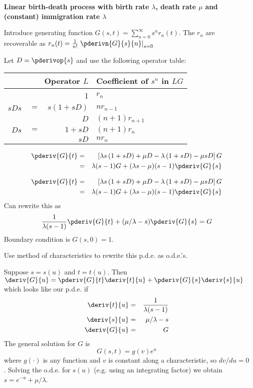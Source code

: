 \documentclass{beamer}
\begin{document}
\begin{frame}{}
{\bf Linear birth-death process with birth rate $\lambda$, death rate $\mu$ and (constant) immigration rate $\lambda$}

 Introduce generating function $G(s,t) = \sum_{n=0}^\infty s^n r_n(t)$.
The $r_n$ are recoverable as $r_n(t) = \frac{1}{n!} \left. \pderivn{G}{s}{n} \right|_{s=0}$

 Let $D = \pderivop{s}$ and use the following operator table: %
\begin{tabular}{|rcr|l|}
\hline
\multicolumn{3}{|r|}{Operator $L$}  & Coefficient of $s^n$ in $LG$ \\
\hline
& & 1 & $r_n$ \\
$s D s$ & $=$ & $s \left( 1 + s D \right)$ & $n r_{n-1}$ \\
& & $D$ & $(n+1) r_{n+1}$ \\
$D s$ & $=$ & $1 + s D$ & $(n+1) r_n$ \\
& & $s D$ & $n r_n$ \\
\hline
\end{tabular}
\small
\begin{eqnarray*}
\pderiv{G}{t} & = & \left[ \lambda s \left( 1 + s D \right) + \mu D - \lambda \left( 1 + s D \right) - \mu s D \right] G \\
& = & \lambda(s-1) G + (\lambda s - \mu)(s-1) \pderiv{G}{s}
\end{eqnarray*}
\normalsize
\end{frame}

\begin{frame}{}
\begin{eqnarray*}
\pderiv{G}{t} & = & \left[ \lambda s \left( 1 + s D \right) + \mu D - \lambda \left( 1 + s D \right) - \mu s D \right] G \\
& = & \lambda(s-1) G + (\lambda s - \mu)(s-1) \pderiv{G}{s}
\end{eqnarray*}
Can rewrite this as
\[
\frac{1}{\lambda(s-1)} \pderiv{G}{t} + (\mu/\lambda - s) \pderiv{G}{s} = G
\]
Boundary condition is $G(s,0) = 1$.

\end{frame}

\begin{frame}{}
Use method of characteristics to rewrite this p.d.e. as o.d.e.'s.

Suppose $s=s(u)$ and $t=t(u)$. Then
$\displaystyle
\deriv{G}{u} = \pderiv{G}{t} \deriv{t}{u} + \pderiv{G}{s} \deriv{s}{u}
$
which looks like our p.d.e. if
\begin{eqnarray*}
\deriv{t}{u} & = & \frac{1}{\lambda (s-1)} \\
\deriv{s}{u} & = & \mu/\lambda - s \\
\deriv{G}{u} & = & G
\end{eqnarray*}
The general solution for $G$ is
\[
G(s,t) = g(v) e^u
\]
where $g(\cdot)$ is any function and $v$ is constant along a characteristic, so $dv/du=0$.
Solving the o.d.e. for $s(u)$ (e.g. using an integrating factor) we obtain
$s = e^{-u} + \mu / \lambda$.
\end{frame}
\end{document}
